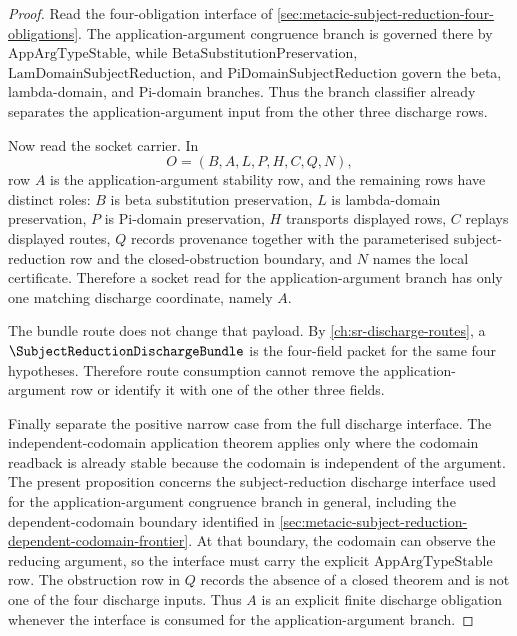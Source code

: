 \begin{proof}
Read the four-obligation interface of \autoref{sec:metacic-subject-reduction-four-obligations}. The application-argument congruence branch is governed there by $\mathrm{AppArgTypeStable}$, while $\mathrm{BetaSubstitutionPreservation}$, $\mathrm{LamDomainSubjectReduction}$, and $\mathrm{PiDomainSubjectReduction}$ govern the beta, lambda-domain, and Pi-domain branches. Thus the branch classifier already separates the application-argument input from the other three discharge rows.

Now read the socket carrier. In
$$
O=(B,A,L,P,H,C,Q,N),
$$
row $A$ is the application-argument stability row, and the remaining rows have distinct roles: $B$ is beta substitution preservation, $L$ is lambda-domain preservation, $P$ is Pi-domain preservation, $H$ transports displayed rows, $C$ replays displayed routes, $Q$ records provenance together with the parameterised subject-reduction row and the closed-obstruction boundary, and $N$ names the local certificate. Therefore a socket read for the application-argument branch has only one matching discharge coordinate, namely $A$.

The bundle route does not change that payload. By \autoref{ch:sr-discharge-routes}, a $\SubjectReductionDischargeBundle$ is the four-field packet for the same four hypotheses. Therefore route consumption cannot remove the application-argument row or identify it with one of the other three fields.

Finally separate the positive narrow case from the full discharge interface. The independent-codomain application theorem applies only where the codomain readback is already stable because the codomain is independent of the argument. The present proposition concerns the subject-reduction discharge interface used for the application-argument congruence branch in general, including the dependent-codomain boundary identified in \autoref{sec:metacic-subject-reduction-dependent-codomain-frontier}. At that boundary, the codomain can observe the reducing argument, so the interface must carry the explicit $\mathrm{AppArgTypeStable}$ row. The obstruction row in $Q$ records the absence of a closed theorem and is not one of the four discharge inputs. Thus $A$ is an explicit finite discharge obligation whenever the interface is consumed for the application-argument branch.
\end{proof}


